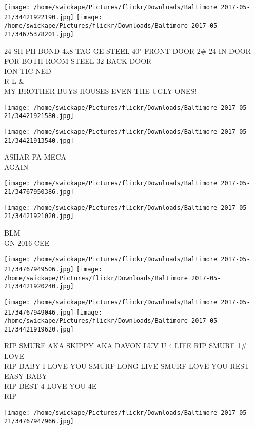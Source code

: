 \documentclass[10pt,letterpaper]{article}
\begin{document}
\texttt{[image: /home/swickape/Pictures/flickr/Downloads/Baltimore 2017-05-21/34421922190.jpg]}
\texttt{[image: /home/swickape/Pictures/flickr/Downloads/Baltimore 2017-05-21/34675378201.jpg]}

24 SH PH BOND 4x8 TAG GE STEEL 40" FRONT DOOR 2\# 24 IN DOOR FOR BOTH ROOM STEEL 32 BACK DOOR\\
ION TIC NED\\
R L \&\\
MY BROTHER BUYS HOUSES EVEN THE UGLY ONES!\\
\pagebreak

\texttt{[image: /home/swickape/Pictures/flickr/Downloads/Baltimore 2017-05-21/34421921580.jpg]}

\vspace{0.25in}
\texttt{[image: /home/swickape/Pictures/flickr/Downloads/Baltimore 2017-05-21/34421913540.jpg]}

ASHAR PA MECA\\
AGAIN\\
\pagebreak

\texttt{[image: /home/swickape/Pictures/flickr/Downloads/Baltimore 2017-05-21/34767950386.jpg]}

\vspace{0.25in}
\texttt{[image: /home/swickape/Pictures/flickr/Downloads/Baltimore 2017-05-21/34421921020.jpg]}

BLM\\
GN 2016 CEE\\
\pagebreak

\texttt{[image: /home/swickape/Pictures/flickr/Downloads/Baltimore 2017-05-21/34767949506.jpg]}
\texttt{[image: /home/swickape/Pictures/flickr/Downloads/Baltimore 2017-05-21/34421920240.jpg]}

\texttt{[image: /home/swickape/Pictures/flickr/Downloads/Baltimore 2017-05-21/34767949046.jpg]}
\texttt{[image: /home/swickape/Pictures/flickr/Downloads/Baltimore 2017-05-21/34421919620.jpg]}

RIP SMURF AKA SKIPPY AKA DAVON LUV U 4 LIFE RIP SMURF 1\# LOVE\\
RIP BABY I LOVE YOU SMURF LONG LIVE SMURF LOVE YOU REST EASY BABY\\
RIP BEST 4 LOVE YOU 4E\\
RIP\\
\pagebreak

\texttt{[image: /home/swickape/Pictures/flickr/Downloads/Baltimore 2017-05-21/34767947966.jpg]}
\end{document}
